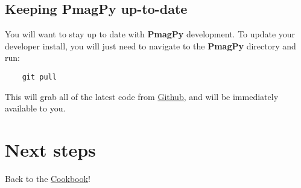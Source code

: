 \documentclass[11pt]{article}
\begin{document}
\subsection{Keeping PmagPy up-to-date}


    You will want to stay up to date with {\bf PmagPy} development.  To update your developer install, you will just need to navigate to the {\bf PmagPy} directory and run:

\begin{verbatim}
    git pull
\end{verbatim}

This will grab all of the latest code from \href{https://github.com/PmagPy/PmagPy}{Github}, and will be immediately available to you.

\section{Next steps}

Back to the \href{https://earthref.org/PmagPy/cookbook/#next_steps}{Cookbook}!
\end{document}
